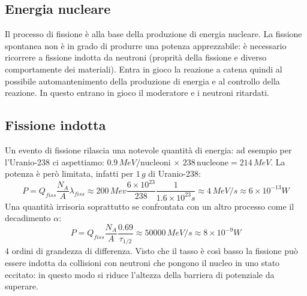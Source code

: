 \subsection{Energia nucleare}
Il processo di fissione è alla base della produzione di energia nucleare. La fissione spontanea non è in grado di produrre una potenza apprezzabile: è necessario ricorrere a fissione indotta da neutroni (proprità della fissione e diverso comportamente dei materiali). Entra in gioco la reazione a catena quindi al possibile automantenimento della produzione di energia e al controllo della reazione. In questo entrano in gioco il moderatore e i neutroni ritardati.
\subsection{Fissione indotta}
Un evento di fissione rilascia una notevole quantità di energia: ad esempio per l'Uranio-238 ci aspettiamo: $0.9\,MeV/\text{nucleoni} \,\times\, 238\,\text{nucleone}=214\,MeV $. La potenza è però limitata, infatti per $1\,g$ di Uranio-238:
\begin{equation*}
    P=Q_{fiss}\frac{N_A}{A}\lambda_{fiss}\approx 200\, Mev\frac{6\times10^{23}}{238}\frac{1}{1.6\times10^{23}s}\approx4\,MeV/s \approx6\times10^{-13}W
\end{equation*}
Una quantità irrisoria soprattutto se confrontata con un altro processo come il decadimento $\alpha$:
\begin{equation*}
    P=Q_{fiss}\frac{N_A}{A}\frac{0.69}{\tau_{1/2}}\approx50000\,MeV/s\approx8\times10^{-9}W
\end{equation*}
4 ordini di grandezza di differenza. Visto che il tasso è così basso la fissione può essere indotta da collisioni con neutroni che pongono il nucleo in uno stato eccitato: in questo modo si riduce l'altezza della barriera di potenziale da superare. 

